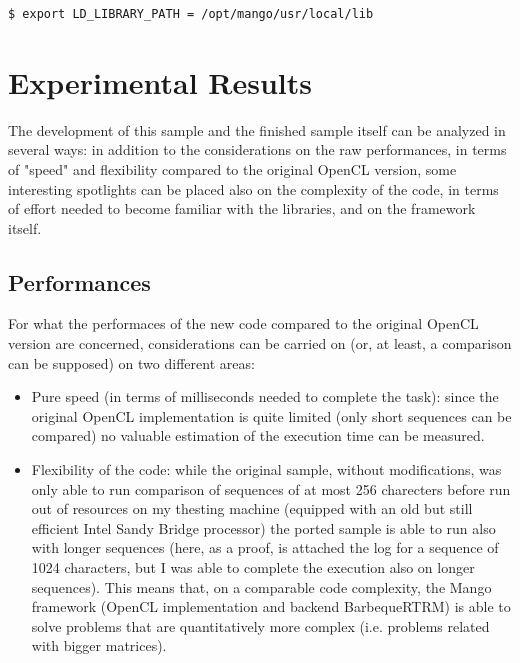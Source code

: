 \begin{lstlisting}[language=bash]
      $ export LD_LIBRARY_PATH = /opt/mango/usr/local/lib
\end{lstlisting}

\section{Experimental Results}

The development of this sample and the finished sample itself can be analyzed in several ways: in addition to the considerations on the raw performances, in terms of "speed" and flexibility compared to the original OpenCL version, some interesting spotlights can be placed also on the complexity of the code, in terms of effort needed to become familiar with the libraries, and on the framework itself.

\subsection{Performances}
For what the performaces of the new code compared to the original OpenCL version are concerned, considerations can be carried on (or, at least, a comparison can be supposed) on two different areas:
\begin{itemize}
      \item Pure speed (in terms of milliseconds needed to complete the task): since the original OpenCL implementation is quite limited (only short sequences can be compared) no valuable estimation of the execution time can be measured.
      \item Flexibility of the code: while the original sample, without modifications, was only able to run comparison of sequences of at most 256 charecters before run out of resources on my thesting machine (equipped with an old but still efficient Intel Sandy Bridge processor) the ported sample is able to run also with longer sequences (here, as a proof, is attached the log for a sequence of 1024 characters, but I was able to complete the execution also on longer sequences). This means that, on a comparable code complexity, the Mango framework (OpenCL implementation and backend BarbequeRTRM) is able to solve problems that are quantitatively more complex (i.e. problems related with bigger matrices).
\end{itemize}



